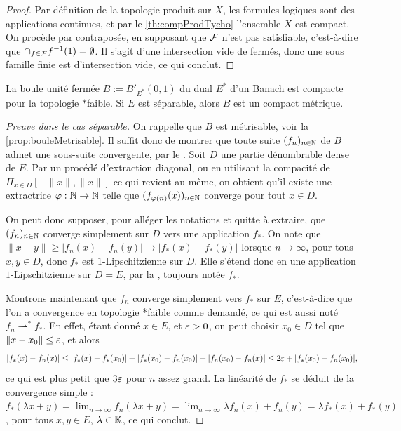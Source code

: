 \begin{proof}
	Par définition de la topologie produit sur $X$, les formules logiques sont des applications continues, et par le \cref{th:compProdTycho} l'ensemble $X$ est compact. On procède par contraposée, en supposant que $\mathcal{F}$ n'est pas satisfiable, c'est-à-dire que $\cap_{f \in \mathcal{F}} f^{-1}(1)= \emptyset$. Il s'agit d'une intersection vide de fermés, donc une sous famille finie est d'intersection vide, ce qui conclut.  
\end{proof}

\begin{theorem}
\label{th:BanachAlaoglu}
%
La boule unité fermée $B := B'_{E^*}(0,1)$ du dual $E^*$ d'un Banach est compacte pour la topologie $*$faible. 
Si $E$ est séparable, alors $B$ est un compact métrique.
\end{theorem}

\begin{proof}[Preuve dans le cas séparable]
On rappelle que $B$ est métrisable, voir la \cref{prop:bouleMetrisable}. Il suffit donc de montrer que toute suite $(f_n)_{n \in \mathbb{N}}$ de $B$ admet une sous-suite convergente, par le . 
Soit $D$ une partie dénombrable dense de $E$. Par un procédé d'extraction diagonal, ou en utilisant la compacité de $\Pi_{x\in D} [-\|x\|,\|x\|]$ ce qui revient au même, on obtient qu'il existe une extractrice $\varphi : \mathbb{N} \to \mathbb{N}$ telle que $(f_{\varphi(n)}(x) )_{n \in \mathbb{N}}$ converge pour tout $x \in D$.

On peut donc supposer, pour alléger les notations et quitte à extraire, que $(f_n)_{n \in \mathbb{N}}$ converge simplement sur $D$ vers une application $f_*$.
On note que $\|x-y\| \geq |f_n(x)-f_n(y)| \to |f_*(x)-f_*(y)|$ lorsque $n \to \infty$, pour tous $x,y \in D$, donc $f_*$ est $1$-Lipschitzienne  sur $D$. Elle s'étend donc en une application $1$-Lipschitzienne sur $\overline D = E$, par la , toujours notée $f_*$. 

Montrons maintenant que $f_n$ converge simplement vers $f_*$ sur $E$, c'est-à-dire que l'on a convergence en topologie *faible comme demandé, ce qui est aussi noté $f_n \rightharpoonup^* f_*$. En effet, étant donné $x\in E$, et $\varepsilon>0$, on peut choisir $x_0 \in D$ tel que $\|x-x_0\| \leq \varepsilon$, et alors 
\begin{equation*}
	|f_*(x)-f_n(x)|\leq 	|f_*(x)-f_*(x_0)| + |f_*(x_0)-f_n(x_0)| + |f_n(x_0)-f_n(x)| \leq 2 \varepsilon + |f_*(x_0)-f_n(x_0)|,
\end{equation*}
ce qui est plus petit que $3 \varepsilon$ pour $n$ assez grand. 
La linéarité de $f_*$ se déduit de la convergence simple : $f_*(\lambda x+y) = \lim_{n \to \infty} f_n(\lambda x+y) = \lim_{n \to \infty} \lambda f_n(x)+f_n(y) = \lambda f_*(x)+f_*(y)$, pour tous $x,y \in E$, $\lambda \in \mathbb{K}$, ce qui conclut. 
\end{proof}

